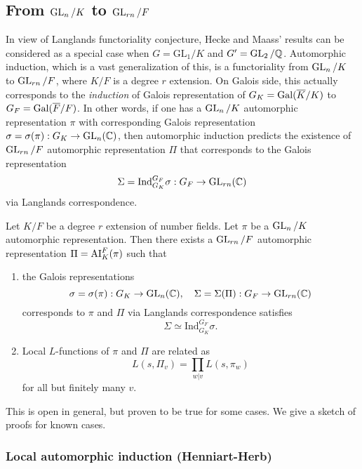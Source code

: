 \subsection{From $\operatorname{\mathrm{GL}}_{n}/K$ to $\operatorname{\mathrm{GL}}_{rn}/F$}
In view of Langlands functoriality conjecture, Hecke and Maass' results can be considered as a special case when $G = \mathrm{GL}_{1} / K$ and $G' = \operatorname{\mathrm{GL}}_{2}/\mathbb{Q}$. 
Automorphic induction, which is a vast generalization of this, is a functoriality from $\operatorname{\mathrm{GL}}_{n}/K$ to $\operatorname{\mathrm{GL}}_{rn}/F$, where $K/F$ is a degree $r$ extension.
On Galois side, this actually corresponds to the \emph{induction} of Galois representation of $G_{K} = \operatorname{\mathrm{Gal}}(\overline{K}/K)$ to $G_{F} = \operatorname{\mathrm{Gal}}(\overline{F}/F)$.
In other words, if one has a $\operatorname{\mathrm{GL}}_{n}/K$ automorphic representation $\pi$ with corresponding Galois representation $\sigma = \sigma(\pi): G_{K} \to \operatorname{\mathrm{GL}}_{n}(\mathbb{C})$, 
then automorphic induction predicts the existence of $\operatorname{\mathrm{GL}}_{rn}/F$ automorphic representation $\Pi$ that corresponds to the Galois representation
$$
\Sigma = \mathrm{Ind}_{G_{K}}^{G_{F}} \sigma : G_{F} \to \operatorname{\mathrm{GL}}_{rn}(\mathbb{C})
$$
via Langlands correspondence.

\begin{conjecture}
Let $K/F$ be a degree $r$ extension of number fields. 
Let $\pi$ be a $\operatorname{\mathrm{GL}}_{n}/K$ automorphic representation. 
Then there exists a $\operatorname{\mathrm{GL}}_{rn}/F$ automorphic representation $\Pi = \operatorname{\mathrm{AI}}_{K}^{F}(\pi)$ such that 
\begin{enumerate}
    \item the Galois representations 
    $$
    \sigma = \sigma(\pi): G_{K} \to \operatorname{\mathrm{GL}}_{n}(\mathbb{C}), \quad \Sigma = \Sigma(\Pi): G_{F} \to \operatorname{\mathrm{GL}}_{rn}(\mathbb{C})
    $$
    corresponds to $\pi$ and $\Pi$ via Langlands correspondence satisfies 
    $$
    \Sigma \simeq \mathrm{Ind}_{G_{K}}^{G_{F}} \sigma.
    $$
    \item Local $L$-functions of $\pi$ and $\Pi$ are related as
    $$
    L(s, \Pi_{v}) = \prod_{w|v} L(s, \pi_{w})
    $$
    for all but finitely many $v$. 
\end{enumerate}
\end{conjecture}

This is open in general, but proven to be true for some cases.
We give a sketch of proofs for known cases.

\subsubsection{Local automorphic induction (Henniart-Herb)}

